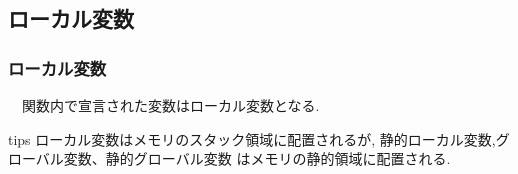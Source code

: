 \documentclass[dvipdfmx]{beamer}
\begin{document}
\subsection{ローカル変数}
\begin{frame}[label=53]
    \frametitle{ローカル変数}
    　関数内で宣言された変数はローカル変数となる.
    \begin{table}
    \centering
    \end{table}
    \begin{itembox}[l]{tips}
        ローカル変数はメモリのスタック領域に配置されるが,
            静的ローカル変数,グローバル変数、静的グローバル変数
            はメモリの静的領域に配置される.
    \end{itembox}
    \vfill \hfill 
    \hyperlink{52}{}
    \space
    \hyperlink{54}{}
\end{frame}
\end{document}
